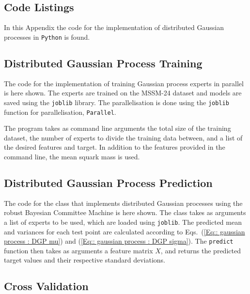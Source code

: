 \documentclass[twoside,english]{uiofysmaster}
\begin{document}
{{\begin{appendices}
\chapter{Code Listings}\label{App::Code listings}

In this Appendix the code for the implementation of distributed Gaussian processes in \verb|Python| is found. 

\section{Distributed Gaussian Process Training}\label{App:Distributed Gaussian Process Training}

The code for the implementation of training Gaussian process experts in parallel is here shown. The experts are trained on the MSSM-24 dataset and models are saved using the  \verb|joblib| library. The parallelisation is done using the \verb|joblib| function for parallelisation, \verb|Parallel|. 

The program takes as command line arguments the total size of the training dataset, the number of experts to divide the training data between, and a list of the desired features and target. In addition to the features provided in the command line, the mean squark mass is used.



\section{Distributed Gaussian Process Prediction}\label{App:Distributed Gaussian Process Prediction}

The code for the class that implements distributed Gaussian processes using the robust Bayesian Committee Machine is here shown. The class takes as arguments a list of experts to be used, which are loaded using \verb|joblib|. The predicted mean and variances for each test point are calculated according to Eqs.~(\ref{Eq:: gaussian process : DGP mu}) and (\ref{Eq:: gaussian process : DGP sigma}). The \verb|predict| function then takes as arguments a feature matrix $X$, and returns the predicted target values and their respective standard deviations. 



\section{Cross Validation}\label{App:Cross validation}


\end{appendices}}}
\end{document}
